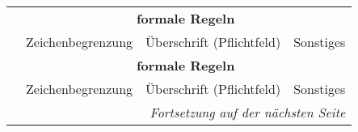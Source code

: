 \begin{landscape} \footnotesize
  \begin{longtable}{l|llp{100mm}}

  & \multicolumn{3}{c}{\bfseries formale Regeln} \\
  & Zeichenbegrenzung & Überschrift (Pflichtfeld) & Sonstiges \\\hline
  \endfirsthead

  & \multicolumn{3}{c}{\bfseries formale Regeln} \\
  & Zeichenbegrenzung & Überschrift (Pflichtfeld) & Sonstiges \\\hline
  \endhead

  \hline \multicolumn{4}{r}{\emph{Fortsetzung auf der nächsten Seite}}
  \endfoot

  \hline
  \endlastfoot


\end{longtable}
\end{landscape}
